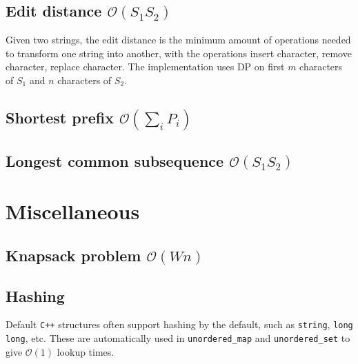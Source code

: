 \subsection{Edit distance $\mathcal O(S_1S_2)$}

Given two strings, the edit distance is the minimum amount of operations needed to transform one string into another, with the operations insert character, remove character, replace character. The implementation uses DP on first $m$ characters of $S_1$ and $n$ characters of $S_2$.



\subsection{Shortest prefix $\mathcal O(\sum_i P_i)$}




\subsection{Longest common subsequence $\mathcal O(S_1S_2)$}






\section{Miscellaneous}

\subsection{Knapsack problem $\mathcal O(Wn)$}




\subsection{Hashing}

Default \texttt{C++} structures often support hashing by the default, such as \texttt{string}, \texttt{long long}, etc. These are automatically used in \texttt{unordered\_map} and \texttt{unordered\_set} to give $\mathcal O(1)$ lookup times.

